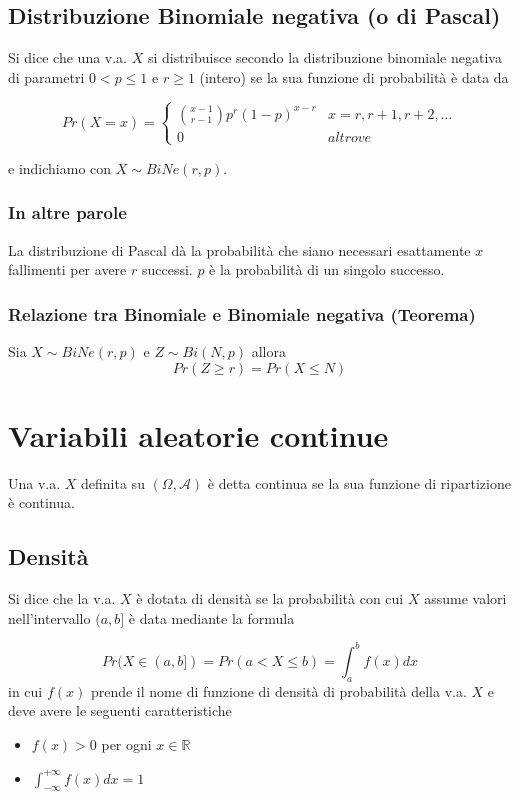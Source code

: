 \documentclass[a4paper]{report}
\begin{document}
  \subsection{Distribuzione Binomiale negativa (o di Pascal)}
  Si dice che una v.a. $X$ si distribuisce secondo la distribuzione binomiale negativa di parametri $0 < p \leqslant 1$ e $r \geq 1$ (intero) se la sua funzione di probabilità è data da

  \[
    Pr(X=x)=
      \begin{cases}
          \binom{x-1}{r-1} p^r (1-p)^{x-r} & x=r, r+1, r+2,\dots \\
          0 & altrove
      \end{cases}
  \]

  e indichiamo con $X \sim BiNe(r,p)$.

  \subsubsection{In altre parole}
  La distribuzione di Pascal dà la probabilità che siano necessari esattamente $x$ fallimenti per avere $r$ successi. $p$ è la probabilità di un singolo successo.

  \subsubsection{Relazione tra Binomiale e Binomiale negativa (Teorema)}
  Sia $X \sim BiNe(r,p)$ e $Z \sim Bi(N,p)$ allora
  \[ Pr(Z \geq r) = Pr(X \leqslant N) \]

  \section{Variabili aleatorie continue}
  Una v.a. $X$ definita su $(\Omega, \mathcal{A})$ è detta continua se la sua funzione di ripartizione è continua.

  \subsection{Densità}
  Si dice che la v.a. $X$ è dotata di densità se la probabilità con cui $X$ assume valori nell'intervallo $(a,b]$ è data mediante la formula

  \[ Pr(X \in (a,b]) = Pr(a < X \leqslant b) = \int_{a}^{b} f(x)  dx \]
  in cui $f(x)$ prende il nome di funzione di densità di probabilità della v.a. $X$ e deve avere le seguenti caratteristiche
  \begin{itemize}
    \item $f(x) > 0$ per ogni $x \in \mathbb{R}$
    \item $\int_{-\infty}^{+\infty} f(x) dx = 1$
  \end{itemize}
\end{document}
